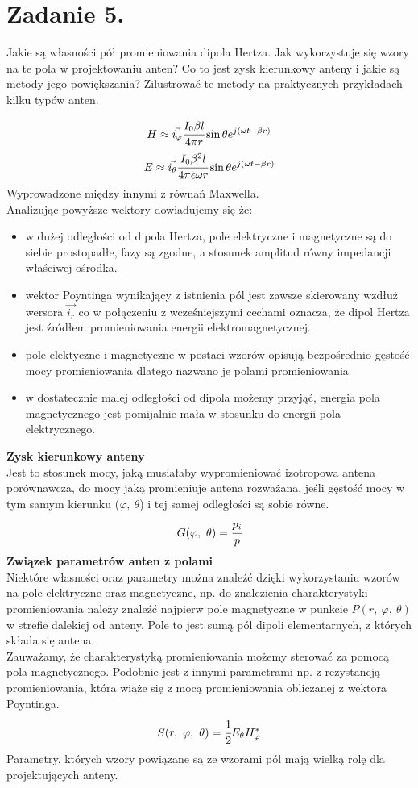 \section*{Zadanie 5.}
\begin{task}
Jakie są własności pół promieniowania dipola Hertza. Jak wykorzystuje się wzory na te pola w projektowaniu anten? Co to jest zysk kierunkowy anteny i jakie są metody jego powiększania? Zilustrować te metody na praktycznych przykładach kilku typów anten.\\
\end{task}

\begin{solution}

$$H\approx\vec{i_{\varphi}}\cfrac{I_{0}\beta l}{4\pi r}\sin{\theta}e^{j(\omega t-\beta r)}$$
$$E\approx\vec{i_{\theta}}\cfrac{I_{0}\beta^{2} l}{4\pi\epsilon\omega r}\sin{\theta}e^{j(\omega t-\beta r)}$$
Wyprowadzone między innymi z równań Maxwella.\\
Analizując powyższe wektory dowiadujemy się że:
\begin{itemize}
\item w dużej odległości od dipola Hertza, pole elektryczne i magnetyczne są do siebie prostopadłe, fazy są zgodne, a stosunek amplitud równy impedancji właściwej ośrodka.
\item wektor Poyntinga wynikający z istnienia pól jest zawsze skierowany wzdłuż wersora $\vec{i_{r}}$ co w połączeniu z wcześniejszymi cechami oznacza, że dipol Hertza jest źródłem promieniowania energii elektromagnetycznej.
\item pole elektyczne i magnetyczne w postaci wzorów opisują bezpośrednio gęstość mocy promieniowania dlatego nazwano je polami promieniowania
\item w dostatecznie malej odległości od dipola możemy przyjąć, energia pola magnetycznego jest pomijalnie mała w stosunku do energii pola elektrycznego.
\end{itemize}
\textbf{Zysk kierunkowy anteny}\\
Jest to stosunek mocy, jaką musiałaby wypromieniować izotropowa antena porównawcza, do mocy jaką promieniuje antena rozważana, jeśli gęstość mocy w tym samym kierunku ($\varphi,\ \theta$) i tej samej odległości są sobie równe.
$$G(\varphi,\ \theta)=\cfrac{p_i}{p}$$
\textbf{Związek parametrów anten z polami}\\
Niektóre własności oraz parametry można znaleźć dzięki wykorzystaniu wzorów na pole elektryczne oraz magnetyczne, np. do znalezienia charakterystyki promieniowania należy znaleźć najpierw pole magnetyczne w punkcie $P(r, \ \varphi,\ \theta)$ w strefie dalekiej od anteny. Pole to jest sumą pól dipoli elementarnych, z których składa się antena.\\
Zauważamy, że charakterystyką promieniowania możemy sterować za pomocą pola magnetycznego. Podobnie jest z innymi parametrami np. z rezystancją promieniowania, która wiąże się z mocą promieniowania obliczanej z wektora Poyntinga.
$$S(r,\ \varphi,\ \theta)=\cfrac{1}{2}E_{\theta}H_{\varphi}^{*}$$
Parametry, których wzory powiązane są ze wzorami pól mają wielką rolę dla projektujących anteny.\\


\end{solution}
